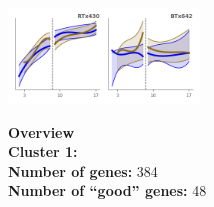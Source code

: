 \begin{multicols}{2}
\includegraphics[width=2in]{figures/clusters/leaf_Preflowering_0.png}
\columnbreak

\noindent \textbf{Overview}\\\textbf{Cluster 1:}  \\
\textbf{Number of genes:} 384 \\
\textbf{Number of ``good'' genes:} 48 \\
\end{multicols}

